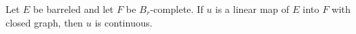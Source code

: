 Let $E$ be barreled and let $F$ be $B_r$-complete. If $u$ is a linear map of $E$ into $F$ with closed graph, then $u$ is continuous.